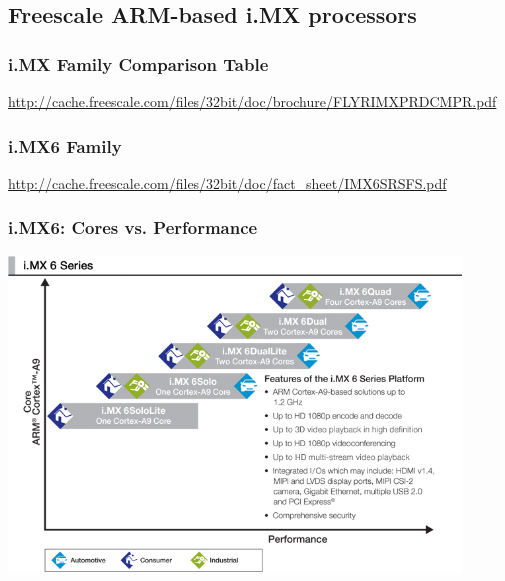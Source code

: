 \subsection{Freescale ARM-based i.MX processors}

\begin{frame}
  \frametitle{i.MX Family Comparison Table}
  \url{http://cache.freescale.com/files/32bit/doc/brochure/FLYRIMXPRDCMPR.pdf}
\end{frame}

\begin{frame}
  \frametitle{i.MX6 Family}
  \url{http://cache.freescale.com/files/32bit/doc/fact_sheet/IMX6SRSFS.pdf}
\end{frame}

\begin{frame}
  \frametitle{i.MX6: Cores vs. Performance}
    \includegraphics[width=0.9\textwidth]{slides/imx6-application-processors/IMX_ROADMAP_IMG.jpg}\\
\end{frame}
